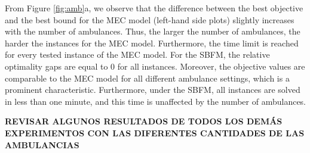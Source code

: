  From Figure \ref{fig:amb}a, we observe that the difference between the best objective and the best bound for the MEC model (left-hand side plots) slightly increases with the number of ambulances. Thus, the larger the number of ambulances, the harder the instances for the MEC model. Furthermore, the time limit is reached for every tested instance of the MEC model. For the SBFM, the relative optimality gaps are equal to 0 for all instances. Moreover, the objective values are comparable to the MEC model for all different ambulance settings, which is a prominent characteristic. Furthermore, under the SBFM, all instances are solved in less than one minute, and this time is unaffected by the number of ambulances.  

\textbf{REVISAR ALGUNOS RESULTADOS DE TODOS LOS DEMÁS EXPERIMENTOS CON LAS DIFERENTES CANTIDADES DE LAS AMBULANCIAS}




